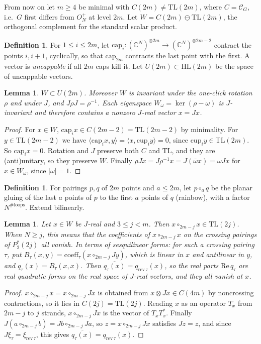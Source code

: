 \documentclass[11pt]{amsart}
\newtheorem{lemma}[theorem]{Lemma}
\theoremstyle{definition}
\newtheorem{definition}[theorem]{Definition}
\theoremstyle{remark}
\theoremstyle{plain}
\numberwithin{equation}{section}
\numberwithin{table}{section}
\newcommand{\C}{\mathbb C}
\newcommand{\TL}{\mathrm{TL}}
\newcommand{\HL}{\mathrm{HL}}
\begin{document}
From now on let $m\ge4$ be minimal with $C(2m)\ne\TL(2m)$, where $C=\mathcal C_G$, i.e.\ $G$ first differs from $O_N^+$ at level $2m$. Let
$W=C(2m)\ominus\TL(2m)$, the orthogonal complement for the standard scalar product.

\begin{definition}
For $1\le i\le 2m$, let $\mathrm{cap}_i:(\C^N)^{\otimes 2m}\to(\C^N)^{\otimes 2m-2}$ contract the points $i,i+1$,
cyclically, so that $\mathrm{cap}_{2m}$ contracts the last point with the first. A vector is \emph{uncappable} if all
$2m$ caps kill it. Let $U(2m)\subset\HL(2m)$ be the space of uncappable vectors.
\end{definition}

\begin{lemma}\label{lem:uncap}
$W\subset U(2m)$. Moreover $W$ is invariant under the one-click rotation $\rho$ and under $J$, and
$J\rho J=\rho^{-1}$. Each eigenspace $W_\omega=\ker(\rho-\omega)$ is $J$-invariant and therefore contains
a nonzero $J$-real vector $x=Jx$.
\end{lemma}
\begin{proof}
For $x\in W$, $\mathrm{cap}_i x\in C(2m-2)=\TL(2m-2)$ by minimality. For $y\in\TL(2m-2)$ we have
$\langle \mathrm{cap}_ix,y\rangle=\langle x,\mathrm{cup}_iy\rangle=0$, since $\mathrm{cup}_i y\in\TL(2m)$. So
$\mathrm{cap}_ix=0$. Rotation and $J$ preserve both $C$ and $\TL$, and they are (anti)unitary, so they preserve $W$. Finally
$\rho Jx=J\rho^{-1}x=J(\bar\omega x)=\omega Jx$ for $x\in W_\omega$, since $|\omega|=1$.
\end{proof}

\begin{definition}
For pairings $p,q$ of $2m$ points and $a\le 2m$, let $p\circ_a q$ be the planar gluing of the last $a$ points of $p$
to the first $a$ points of $q$ (rainbow), with a factor $N^{\#\text{loops}}$. Extend bilinearly.
\end{definition}

\begin{lemma}\label{lem:glue}
Let $x\in W$ be $J$-real and $3\le j<m$. Then $x\circ_{2m-j}x\in\TL(2j)$. When $N\ge j$, this means that the
coefficients of $x\circ_{2m-j}x$ on the crossing pairings of $P_2^*(2j)$ all vanish. In terms of sesquilinear forms:
for such a crossing pairing $\tau$, put $B_\tau(x,y)=\mathrm{coeff}_\tau(x\circ_{2m-j}Jy)$, which is linear in $x$ and antilinear
in $y$, and $q_\tau(x)=B_\tau(x,x)$. Then $\overline{q_\tau(x)}=q_{\mathrm{rev}\,\tau}(x)$, so the real parts $\mathrm{Re}\,q_\tau$ are real
quadratic forms on the real space of $J$-real vectors, and they all vanish at $x$.
\end{lemma}
\begin{proof}
$x\circ_{2m-j}x=x\circ_{2m-j}Jx$ is obtained from $x\otimes Jx\in C(4m)$ by noncrossing contractions, so it lies in
$C(2j)=\TL(2j)$. Reading $x$ as an operator $T_x$ from $2m-j$ to $j$ strands, $x\circ_{2m-j}Jx$ is the vector of $T_xT_x^*$.
Finally $J(a\circ_{2m-j}b)=Jb\circ_{2m-j}Ja$, so $z=x\circ_{2m-j}Jx$ satisfies $Jz=z$, and since $J\xi_\tau=\xi_{\mathrm{rev}\,\tau}$,
this gives $\overline{q_\tau(x)}=q_{\mathrm{rev}\,\tau}(x)$.
\end{proof}
\end{document}
